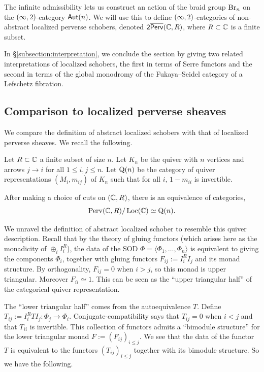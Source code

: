 The infinite admissibility lets us construct an action of the braid group $\operatorname{Br}_n$ on the $(\infty,2)$-category $\mathsf{Aut}(n)$. We will use this to define $(\infty,2)$-categories of non-abstract localized perverse schobers, denoted $\mathsf{2}\overline{\mathsf{Perv}}(\mathbb{C},R)$, where $R\subset\mathbb{C}$ is a finite subset.

In \S\ref{subsection:interpretation}, we conclude the section by giving two related interpretations of localized schobers, the first in terms of Serre functors and the second in terms of the global monodromy of the Fukaya--Seidel category of a Lefschetz fibration.

\subsection{Comparison to localized perverse sheaves}\label{subsection:comparison}
We compare the definition of abstract localized schobers with that of localized perverse sheaves. We recall the following.

\begin{prop}\label{prop:gmvquiver}
    Let $R\subset \mathbb{C}$ a finite subset of size $n$. Let $K_n$ be the quiver with $n$ vertices and arrows $j\to i$ for all $1\leq i,j\leq n$. Let $\operatorname{Q}(n)$ be the category of quiver representations $(M_i,m_{ij})$ of $K_n$ such that for all $i$, $1-m_{ii}$ is invertible.

    After making a choice of cuts on $(\mathbb{C},R)$, there is an equivalence of categories,
    \[\operatorname{Perv}(\mathbb{C},R)/\operatorname{Loc}(\mathbb{C})\simeq \operatorname{Q}(n).\]
\end{prop}

We unravel the definition of abstract localized schober to resemble this quiver description. Recall that by the theory of gluing functors (which arises here as the monadicity of $\oplus_iI_i^R$), the data of the SOD $\Phi=\langle\Phi_1,\dots,\Phi_n\rangle$ is equivalent to giving the components $\Phi_i$, together with gluing functors $F_{ij} := I_i^RI_j$ and its monad structure. By orthogonality, $F_{ij}=0$ when $i>j$, so this monad is upper triangular. Moreover $F_{ii}\simeq 1$. This can be seen as the ``upper triangular half'' of the categorical quiver representation.

The ``lower triangular half'' comes from the autoequivalence $T$. Define $T_{ij} := I_i^RTI_j:\Phi_j\to \Phi_i$. Conjugate-compatibility says that $T_{ij}=0$ when $i<j$ and that $T_{ii}$ is invertible. This collection of functors admits a ``bimodule structure'' for the lower triangular monad $F := (F_{ij})_{i\leq j}$. We see that the data of the functor $T$ is equivalent to the functors $(T_{ij})_{i\leq j}$ together with its bimodule structure. So we have the following.

